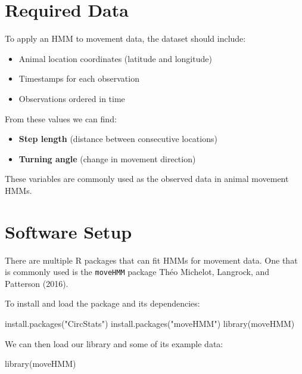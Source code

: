 \documentclass[
  letterpaper,
  DIV=11,
  numbers=noendperiod]{scrreprt}
\newenvironment{Shaded}{\begin{snugshade}}{\end{snugshade}}
\newcommand{\FunctionTok}[1]{\textcolor[rgb]{0.28,0.35,0.67}{#1}}
\newcommand{\NormalTok}[1]{\textcolor[rgb]{0.00,0.23,0.31}{#1}}
\newcommand{\StringTok}[1]{\textcolor[rgb]{0.13,0.47,0.30}{#1}}
\providecommand{\tightlist}{%
  \setlength{\itemsep}{0pt}\setlength{\parskip}{0pt}}
\begin{document}
\section{Required Data}\label{required-data}

To apply an HMM to movement data, the dataset should include:

\begin{itemize}
\tightlist
\item
  Animal location coordinates (latitude and longitude)
\item
  Timestamps for each observation
\item
  Observations ordered in time
\end{itemize}

From these values we can find:

\begin{itemize}
\tightlist
\item
  \textbf{Step length} (distance between consecutive locations)
\item
  \textbf{Turning angle} (change in movement direction)
\end{itemize}

These variables are commonly used as the observed data in animal
movement HMMs.

\section{Software Setup}\label{software-setup}

There are multiple R packages that can fit HMMs for movement data. One
that is commonly used is the \texttt{moveHMM} package Théo Michelot,
Langrock, and Patterson (2016).

To install and load the package and its dependencies:

\begin{Shaded}
\begin{Highlighting}[]
\FunctionTok{install.packages}\NormalTok{(}\StringTok{"CircStats"}\NormalTok{)}
\FunctionTok{install.packages}\NormalTok{(}\StringTok{"moveHMM"}\NormalTok{)}
\FunctionTok{library}\NormalTok{(moveHMM)}
\end{Highlighting}
\end{Shaded}

We can then load our library and some of its example data:

\begin{Shaded}
\begin{Highlighting}[]
\FunctionTok{library}\NormalTok{(moveHMM)}
\end{Highlighting}
\end{Shaded}
\end{document}
